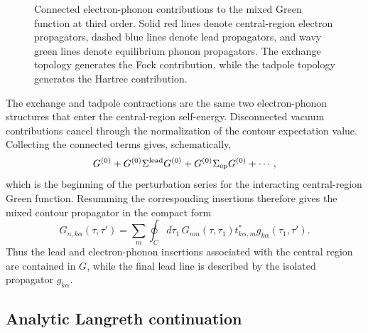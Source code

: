 \documentclass[
 reprint,
 superscriptaddress,
 amsmath,amssymb,
 aps,prb,
 longbibliography,
 floatfix
]{revtex4-2}
\begin{document}
\begin{figure}[ht]
\caption{
Connected electron-phonon contributions to the mixed Green function at third order. Solid red lines denote central-region electron propagators, dashed blue lines denote lead propagators, and wavy green lines denote equilibrium phonon propagators. The exchange topology generates the Fock contribution, while the tadpole topology generates the Hartree contribution.}
\label{fig:mixed-ep-topologies}
\end{figure}
The exchange and tadpole contractions are the same two electron-phonon structures that enter the central-region self-energy. Disconnected vacuum contributions cancel through the normalization of the contour expectation value. Collecting the connected terms gives, schematically,
\begin{equation*}
G^{(0)}
+
G^{(0)}\Sigma^{\rm lead}G^{(0)}
+
G^{(0)}\Sigma_{\rm ep}G^{(0)}
+\cdots ,
\end{equation*}
which is the beginning of the perturbation series for the interacting central-region Green function. Resumming the corresponding insertions therefore gives the mixed contour propagator in the compact form
\begin{equation}
G_{n,k\alpha}(\tau,\tau')
=
\sum_m
\oint_C d\tau_1\,
G_{nm}(\tau,\tau_1)
t_{k\alpha,m}^{*}
g_{k\alpha}(\tau_1,\tau').
\label{eq:mixed-contour-final}
\end{equation}
Thus the lead and electron-phonon insertions associated with the central region are contained in \(G\), while the final lead line is described by the isolated propagator  \(g_{k\alpha}\).

\subsection{Analytic Langreth continuation}
\label{subsec:mixed-continuation}
\end{document}
